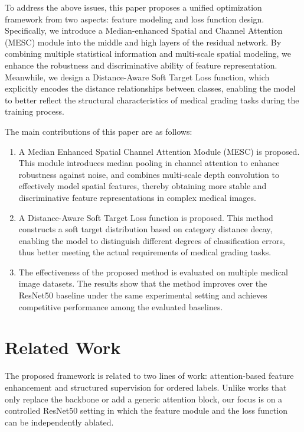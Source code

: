 \documentclass[runningheads]{llncs}
\begin{document}
To address the above issues, this paper proposes a unified optimization framework from two aspects: feature modeling and loss function design. Specifically, we introduce a Median-enhanced Spatial and Channel Attention (MESC) module into the middle and high layers of the residual network. By combining multiple statistical information and multi-scale spatial modeling, we enhance the robustness and discriminative ability of feature representation. Meanwhile, we design a Distance-Aware Soft Target Loss function, which explicitly encodes the distance relationships between classes, enabling the model to better reflect the structural characteristics of medical grading tasks during the training process.

The main contributions of this paper are as follows:
\begin{enumerate}
    \item A Median Enhanced Spatial Channel Attention Module (MESC) is proposed. This module introduces median pooling in channel attention to enhance robustness against noise, and combines multi-scale depth convolution to effectively model spatial features, thereby obtaining more stable and discriminative feature representations in complex medical images.

    \item A Distance-Aware Soft Target Loss function is proposed. This method constructs a soft target distribution based on category distance decay, enabling the model to distinguish different degrees of classification errors, thus better meeting the actual requirements of medical grading tasks.

    \item The effectiveness of the proposed method is evaluated on multiple medical image datasets. The results show that the method improves over the ResNet50 baseline under the same experimental setting and achieves competitive performance among the evaluated baselines.
\end{enumerate}

\section{Related Work}

The proposed framework is related to two lines of work: attention-based feature enhancement and structured supervision for ordered labels. Unlike works that only replace the backbone or add a generic attention block, our focus is on a controlled ResNet50 setting in which the feature module and the loss function can be independently ablated.
\end{document}
